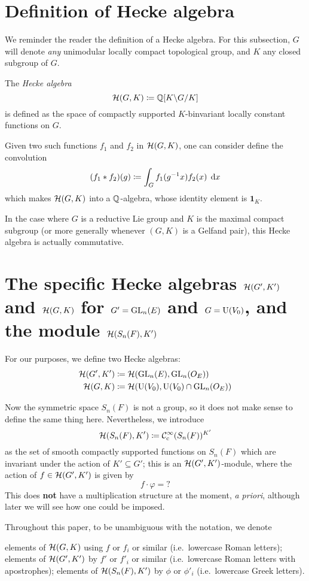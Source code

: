 \section{Definition of Hecke algebra}
We reminder the reader the definition of a Hecke algebra.
For this subsection, $G$ will denote \emph{any}
unimodular locally compact topological group,
and $K$ any closed subgroup of $G$.

\begin{definition}
  The \emph{Hecke algebra}
  \[ \mathcal H(G, K) \coloneqq \mathbb Q[K \backslash G \slash K] \]
  is defined as the space of compactly supported $K$-binvariant
  locally constant functions on $G$.

  Given two such functions $f_1$ and $f_2$ in $\mathcal H(G,K)$,
  one can consider define the convolution
  \[ (f_1 \ast f_2)(g) \coloneqq \int_G f_1(g\inv x) f_2(x) \; \odif x \]
  which makes $\mathcal H(G, K)$ into a $\mathbb Q$-algebra,
  whose identity element is $\mathbf{1}_K$.
\end{definition}
In the case where $G$ is a reductive Lie group and
$K$ is the maximal compact subgroup
(or more generally whenever $(G,K)$ is a Gelfand pair),
this Hecke algebra is actually commutative.

\section{The specific Hecke algebras $\mathcal H(G',K')$ and $\mathcal H(G,K)$
  for $G' = \operatorname{GL}_n(E)$ and $G = \operatorname{U}(V_0)$, and the module $\mathcal H(S_n(F), K')$}
For our purposes, we define two Hecke algebras:
\begin{align*}
  \mathcal H(G', K') &\coloneqq \mathcal H(\operatorname{GL}_n(E), \operatorname{GL}_n(O_E)) \\
  \mathcal H(G, K) &\coloneqq \mathcal H(\operatorname{U}(V_0), \operatorname{U}(V_0) \cap \operatorname{GL}_n(O_E))
\end{align*}

Now the symmetric space $S_n(F)$ is not a group,
so it does not make sense to define the same thing here.
Nevertheless, we introduce
\[ \mathcal H(S_n(F), K') \coloneqq \mathcal C_{\mathrm{c}}^{\infty}(S_n(F))^{K'} \]
as the set of smooth compactly supported functions on $S_n(F)$
which are invariant under the action of $K' \subseteq G'$;
this is an $\mathcal H(G', K')$-module, where the action of $f \in \mathcal H(G', K')$ is given by
\[ f \cdot \varphi = {?} \]
This does \textbf{not} have a multiplication structure at the moment, \emph{a priori},
although later we will see how one could be imposed.

Throughout this paper, to be unambiguous with the notation, we denote
\begin{itemize}
  \ii elements of $\mathcal H(G,K)$ using $f$ or $f_i$ or similar
    (i.e.\ lowercase Roman letters);
  \ii elements of $\mathcal H(G',K')$ by $f'$ or $f'_i$ or similar
    (i.e.\ lowercase Roman letters with apostrophes);
  \ii elements of $\mathcal H(S_n(F),K')$ by $\phi$ or $\phi'_i$
    (i.e.\ lowercase Greek letters).
\end{itemize}

